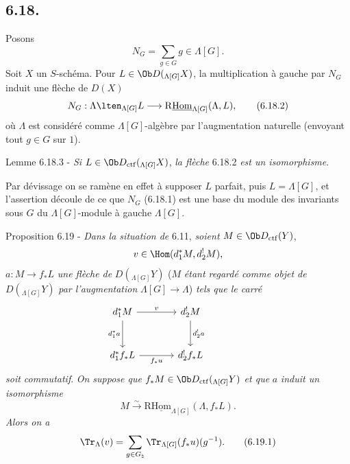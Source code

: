 \subsection*{6.18.}
Posons
\begin{equation}
N_G=\sum_{g\in G} g\in\Lambda[G].
\tag{6.18.1}
\end{equation}
Soit $X$ un $S$-schéma. Pour $L\in\Ob D({}_{\Lambda[G]}X)$, la multiplication à gauche par $N_G$ induit une flèche de $D(X)$
\begin{equation}
N_G:\Lambda\lten_{\Lambda[G]}L
\longrightarrow
\mathrm{R}\underline{\mathrm{Hom}}_{\Lambda[G]}(\Lambda,L),
\tag{6.18.2}
\end{equation}
où $\Lambda$ est considéré comme $\Lambda[G]$-algèbre par l'augmentation naturelle (envoyant tout $g\in G$ sur $1$).

\begin{statement}{Lemme 6.18.3 -}
\emph{Si} $L\in\Ob D_{\mathrm{ctf}}({}_{\Lambda[G]}X)$, \emph{la flèche} 6.18.2 \emph{est un isomorphisme}.
\end{statement}

Par dévissage on se ramène en effet à supposer $L$ parfait, puis $L=\Lambda[G]$, et l'assertion découle de ce que $N_G$ (6.18.1) est une base du module des invariants sous $G$ du $\Lambda[G]$-module à gauche $\Lambda[G]$.

\begin{statement}{Proposition 6.19 -}
\emph{Dans la situation de} 6.11, \emph{soient} $M\in\Ob D_{\mathrm{ctf}}(Y)$,
\[
v\in\Hom(d_1^*M,d_2^!M),
\]
$a:M\to f_*L$ \emph{une flèche de} $D({}_{\Lambda[G]}Y)$ ($M$ \emph{étant regardé comme objet de} $D({}_{\Lambda[G]}Y)$ \emph{par l'augmentation} $\Lambda[G]\to\Lambda$) \emph{tels que le carré}
\[
\begin{tikzcd}[column sep=large,row sep=large]
d_1^*M \arrow[r,"v"] \arrow[d,"d_1^*a"'] & d_2^!M \arrow[d,"d_2^!a"] & {}\\
d_1^*f_*L \arrow[r,"f_*u"'] & d_2^!f_*L
\end{tikzcd}
\]
\emph{soit commutatif}. \emph{On suppose que} $f_*M\in\Ob D_{\mathrm{ctf}}({}_{\Lambda[G]}Y)$ \emph{et que} $a$ \emph{induit un isomorphisme}
\[
M\xrightarrow{\sim}\mathrm{R}\underline{\mathrm{Hom}}_{\Lambda[G]}(\Lambda,f_*L).
\]
\emph{Alors on a}
\begin{equation}
\Tr_{\Lambda}(v)=
\sum_{g\in G_{\natural}}\Tr_{\Lambda[G]}(f_*u)(g^{-1}).
\tag{6.19.1}
\end{equation}
\end{statement}

